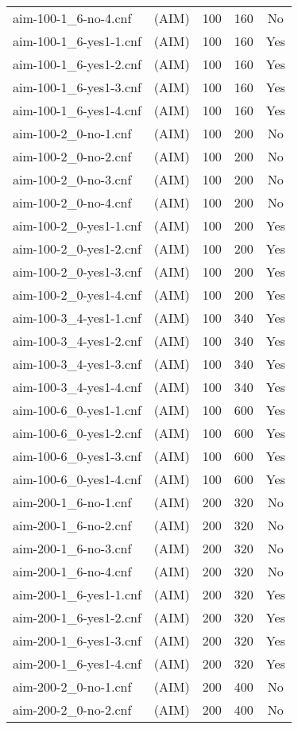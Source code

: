 \begin{supertabular}{|lc|rr|c|}
aim-100-1\_6-no-4.cnf&(AIM)&100&160&No\\ 
aim-100-1\_6-yes1-1.cnf&(AIM)&100&160&Yes\\
aim-100-1\_6-yes1-2.cnf&(AIM)&100&160&Yes\\
aim-100-1\_6-yes1-3.cnf&(AIM)&100&160&Yes\\
aim-100-1\_6-yes1-4.cnf&(AIM)&100&160&Yes\\
aim-100-2\_0-no-1.cnf&(AIM)&100&200&No\\ 
aim-100-2\_0-no-2.cnf&(AIM)&100&200 &No\\ 
aim-100-2\_0-no-3.cnf&(AIM)&100&200   &No\\ 
aim-100-2\_0-no-4.cnf&(AIM)&100&200   &No\\ 
aim-100-2\_0-yes1-1.cnf&(AIM)&100&200   &Yes\\
aim-100-2\_0-yes1-2.cnf&(AIM)&100&200   &Yes\\
aim-100-2\_0-yes1-3.cnf&(AIM)&100&200   &Yes\\
aim-100-2\_0-yes1-4.cnf&(AIM)&100&200   &Yes\\
aim-100-3\_4-yes1-1.cnf&(AIM)&100&340   &Yes\\
aim-100-3\_4-yes1-2.cnf&(AIM)&100&340   &Yes\\
aim-100-3\_4-yes1-3.cnf&(AIM)&100&340   &Yes\\
aim-100-3\_4-yes1-4.cnf&(AIM)&100&340   &Yes\\
aim-100-6\_0-yes1-1.cnf&(AIM)&100&600   &Yes\\
aim-100-6\_0-yes1-2.cnf&(AIM)&100&600   &Yes\\
aim-100-6\_0-yes1-3.cnf&(AIM)&100&600   &Yes\\
aim-100-6\_0-yes1-4.cnf&(AIM)&100&600   &Yes\\
aim-200-1\_6-no-1.cnf&(AIM)&200&320   &No\\ 
aim-200-1\_6-no-2.cnf&(AIM)&200&320   &No\\ 
aim-200-1\_6-no-3.cnf&(AIM)&200&320   &No\\ 
aim-200-1\_6-no-4.cnf&(AIM)&200&320   &No\\ 
aim-200-1\_6-yes1-1.cnf&(AIM)&200&320   &Yes\\
aim-200-1\_6-yes1-2.cnf&(AIM)&200&320   &Yes\\
aim-200-1\_6-yes1-3.cnf&(AIM)&200&320   &Yes\\
aim-200-1\_6-yes1-4.cnf&(AIM)&200&320   &Yes\\
aim-200-2\_0-no-1.cnf&(AIM)&200&400   &No\\ 
aim-200-2\_0-no-2.cnf&(AIM)&200&400   &No\\ 

\end{supertabular}
